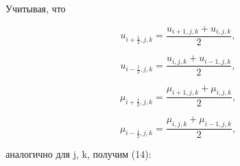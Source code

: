 \documentclass[12pt]{article}
\begin{document}
Учитывая, что 

\begin{equation*}
u_{i+\frac{1}{2},j,k}=\frac{u_{i+1,j,k} + u_{i,j,k}}{2}  ,
\end{equation*}

\begin{equation*}
	u_{i-\frac{1}{2},j,k}=\frac{u_{i,j,k} + u_{i-1,j,k}}{2}  ,
\end{equation*}

\begin{equation*}
	\mu_{i+\frac{1}{2},j,k}=\frac{\mu_{i+1,j,k} + \mu_{i,j,k}}{2}  ,
\end{equation*}

\begin{equation*}
	\mu_{i-\frac{1}{2},j,k}=\frac{\mu_{i,j,k} + \mu_{i-1,j,k}}{2}  ,
\end{equation*}

аналогично для j, k, получим (14):
\end{document}
